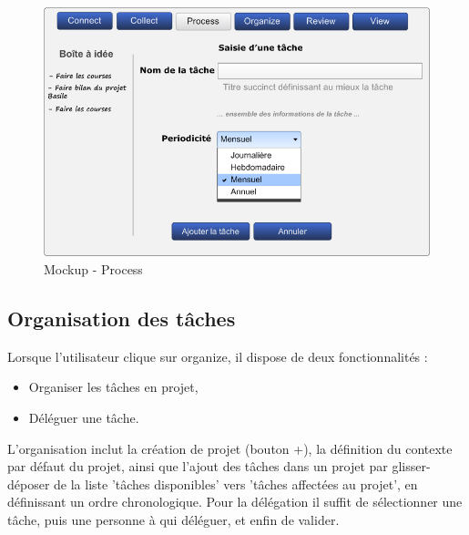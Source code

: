 \begin{figure}[H]
  \begin{center}
  \includegraphics[scale=0.5]{diagrams/process.png}
  \caption{Mockup - Process}
  \end{center}
\end{figure}


\subsection{Organisation des tâches}
Lorsque l'utilisateur clique sur organize, il dispose de deux fonctionnalités :
\begin{itemize}
  \item Organiser les tâches en projet,
  \item Déléguer une tâche.
\end{itemize}
L'organisation inclut la création de projet (bouton +), la définition du
contexte par défaut du projet, ainsi que l'ajout des tâches dans un projet par
glisser-déposer de la liste 'tâches disponibles' vers 'tâches affectées au
projet', en définissant un ordre chronologique.
Pour la délégation il suffit de sélectionner une tâche, puis une personne à qui
déléguer, et enfin de valider.

